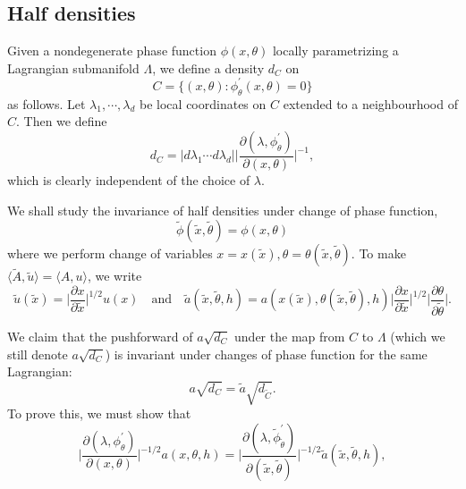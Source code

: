 \documentclass[10pt, a4paper, twoside]{amsart}
\numberwithin{equation}{section}
\theoremstyle{remark}
\begin{document}
\begin{appendix}
	
	
	
	
	
	
	
	
	
	
	
	
	
	
		
		
		
	
	
		
		
		
	
	
	\subsection{Half densities}
	Given a nondegenerate phase function $\phi(x, \theta)$ locally parametrizing a Lagrangian submanifold $\Lambda$, we define a density $d_C$ on $$C = \{(x, \theta) : \phi^\prime_\theta(x, \theta) = 0\} $$
	as follows. Let $\lambda_1, \cdots, \lambda_d$ be local coordinates on $C$ extended to a neighbourhood of $C$. Then we define 
	$$
	d_C = 
	\big| d\lambda_1 \cdots d\lambda_d \big|  \bigg| \frac{\partial (\lambda, \phi^\prime_\theta)}{\partial (x, \theta)} \bigg|^{-1},$$
	which is clearly independent of the choice of $\lambda$. 
	
	We shall study the invariance of half densities under change of phase function, $$\tilde{\phi}(\tilde{x}, \tilde{\theta}) = \phi(x, \theta)$$ where we perform change of variables $x = x(\tilde{x}), \theta = \theta(\tilde{x}, \tilde{\theta}).$ To make $\langle \tilde{A}, \tilde{u} \rangle = \langle A, u \rangle$, we write $$\tilde{u}(\tilde{x}) = \bigg|\frac{\partial x}{\partial \tilde{x}}\bigg|^{1/2} u(x) \quad\mbox{and}\quad \tilde{a}(\tilde{x}, \tilde{\theta}, h) = a(x(\tilde{x}), \theta(\tilde{x}, \tilde{\theta}), h) \bigg|\frac{\partial x}{\partial \tilde{x}}\bigg|^{1/2}\bigg|\frac{\partial \theta}{\partial \tilde{\theta}}\bigg|.$$
	
	We claim that the pushforward of $a\sqrt{d_C}$ under the map from $C$ to $\Lambda$ (which we still denote $a\sqrt{d_C}$) is invariant under changes of phase function  for the same Lagrangian:
	\begin{equation}
	a \sqrt{d_C} = \tilde a \sqrt{d_{\tilde C}}.
	\label{adC}\end{equation}
	To prove this, we must show that 
	$$\bigg|\frac{\partial (\lambda, \phi^\prime_\theta)}{\partial (x, \theta)}\bigg|^{-1/2} a(x, \theta, h) = \bigg|\frac{\partial ({\lambda}, \tilde{\phi}^\prime_{\tilde{\theta}})}{\partial (\tilde{x}, \tilde{\theta})}\bigg|^{-1/2} \tilde{a}(\tilde{x}, \tilde{\theta}, h),$$ 
	

\end{appendix}
\end{document}
